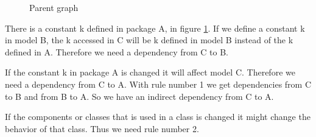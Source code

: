 \documentclass{cslthse-msc}
\begin{document}
\begin{figure}[H]
    \centering
    \qquad
    \subfloat{\raisebox{3.2 cm}{}}
    \caption{Parent graph}
    \label{fig:parentGraph}
\end{figure}

There is a constant k defined in package A, in figure \ref{fig:parentGraph}. If we define a constant k in model B, the k accessed in C will be k defined in model B instead of the k defined in A. Therefore we need a dependency from C to B.

If the constant k in package A is changed it will affect model C. Therefore we need a dependency from C to A. With rule number 1 we get dependencies from C to B and from B to A. So we have an indirect dependency from C to A.

If the components or classes that is used in a class is changed it might change the behavior of that class. Thus we need rule number 2.
\end{document}
